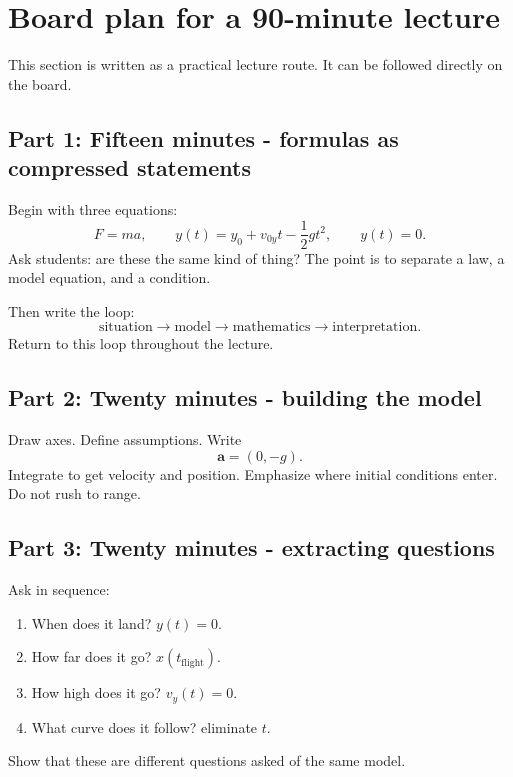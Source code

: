 \documentclass[11pt,a4paper]{article}
\newcommand{\vect}[1]{\boldsymbol{#1}}
\begin{document}
\section{Board plan for a 90-minute lecture}

This section is written as a practical lecture route. It can be followed directly on the board.

\subsection*{Part 1: Fifteen minutes - formulas as compressed statements}

Begin with three equations:
\[
F=ma,
\qquad
 y(t)=y_0+v_{0y}t-\frac12gt^2,
\qquad
 y(t)=0.
\]
Ask students: are these the same kind of thing? The point is to separate a law, a model equation, and a condition.

Then write the loop:
\[
\text{situation}\to\text{model}\to\text{mathematics}\to\text{interpretation}.
\]
Return to this loop throughout the lecture.

\subsection*{Part 2: Twenty minutes - building the model}

Draw axes. Define assumptions. Write
\[
\vect a=(0,-g).
\]
Integrate to get velocity and position. Emphasize where initial conditions enter. Do not rush to range.

\subsection*{Part 3: Twenty minutes - extracting questions}

Ask in sequence:
\begin{enumerate}
    \item When does it land? $y(t)=0$.
    \item How far does it go? $x(t_{\mathrm{flight}})$.
    \item How high does it go? $v_y(t)=0$.
    \item What curve does it follow? eliminate $t$.
\end{enumerate}
Show that these are different questions asked of the same model.
\end{document}
